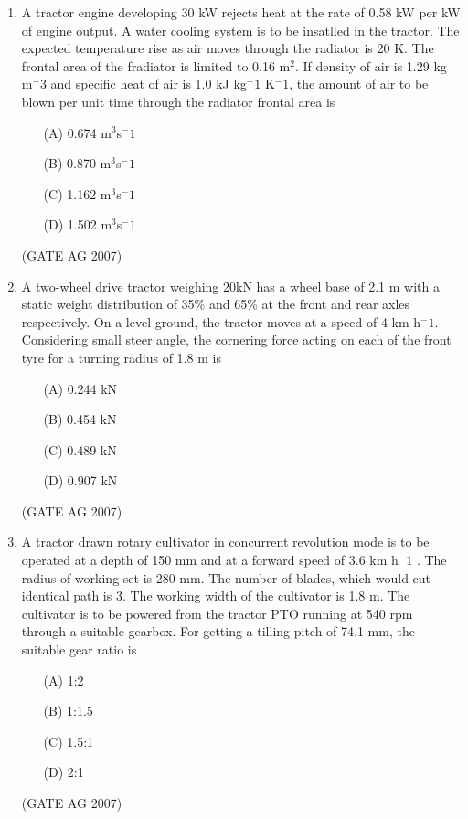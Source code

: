 \documentclass[journal,12pt,onecolumn]{IEEEtran}
\theoremstyle{remark}
\begin{document}
\begin{enumerate}[label=Q\arabic*:]
\item  A tractor engine developing 30 kW rejects heat at the rate of 0.58 kW per kW of engine output. A water cooling system is to be insatlled in the tractor. The expected temperature rise as air moves through the radiator is 20 K. The frontal area of the fradiator is limited to 0.16 m$^2$. If density of air is 1.29 kg m$^-3$ and specific heat of air is 1.0 kJ kg$^-1$ K$^-1$, the amount of air to be blown per unit time through the radiator frontal area is 
\begin{multicols}{4}
\begin{enumerate}
    \item [(A)] 0.674 m$^3$s$^-1$
    \item [(B)] 0.870 m$^3$s$^-1$
    \item [(C)] 1.162 m$^3$s$^-1$
    \item [(D)] 1.502 m$^3$s$^-1$
\end{enumerate}
\end{multicols}
\hfill(GATE AG 2007)

\item  A two-wheel drive tractor weighing 20kN has a wheel base of 2.1 m with a static weight distribution of 35\% and 65\% at the front and rear axles respectively. On a level ground, the tractor moves at a speed of 4 km h$^-1$. Considering small steer angle, the cornering force acting on each of the front tyre for a turning radius of 1.8 m is
\begin{multicols}{4}
    \begin{enumerate}
        \item [(A)] 0.244 kN
        \item [(B)] 0.454 kN
        \item [(C)] 0.489 kN
        \item [(D)] 0.907 kN
    \end{enumerate}
\end{multicols}
\hfill(GATE AG 2007)

\item
 A tractor drawn rotary cultivator in concurrent revolution mode is to be operated at a depth of 150 mm and at a forward speed of 3.6 km h$^-1$ . The radius of working set is 280 mm. The number of blades, which would cut identical path is 3. The working width of the cultivator is 1.8 m. The cultivator is to be powered from the tractor PTO running at 540 rpm through a suitable gearbox. For getting a tilling pitch of 74.1 mm, the suitable gear ratio is 
\begin{multicols}{4}
\begin{enumerate}
    \item [(A)] 1:2
    \item [(B)] 1:1.5
    \item [(C)] 1.5:1
    \item [(D)] 2:1
\end{enumerate}
\end{multicols}
\hfill(GATE AG 2007)


\end{enumerate}
\end{document}
